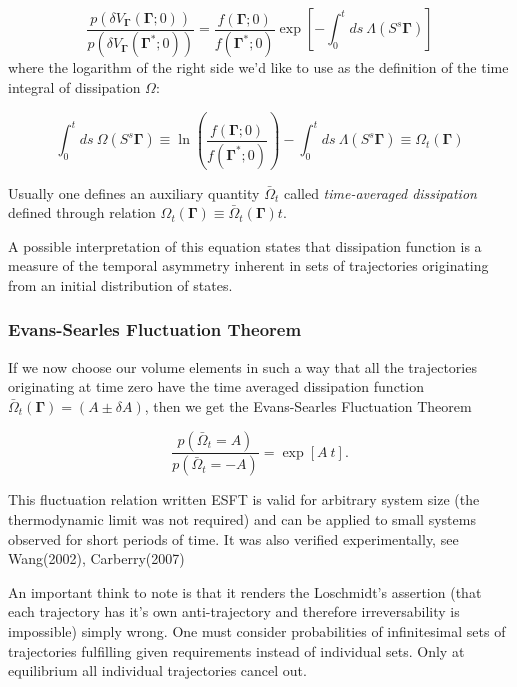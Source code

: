 \documentclass[a4paper,12pt,nofootinbib]{article}
\begin{document}
\begin{equation}
  \frac{p(\delta V_{\bm{\Gamma}}(\bm{\Gamma};0))}{p(\delta V_{\bm{\Gamma}}(\bm{\Gamma}^*;0))}=\frac{f(\bm{\Gamma};0)}{f(\bm{\Gamma}^*;0)} 
  \exp[-\int_0^t ds \ \Lambda(S^s \bm{\Gamma})]
\end{equation}
where the logarithm of the right side we'd like to use as the definition of the time integral of dissipation $\Omega$:

\begin{equation}
  \label{Dissipation}
  \int_0^t ds\ \Omega(S^s \bm{\Gamma})\equiv \ln(\frac{f(\bm{\Gamma};0)}{f(\bm{\Gamma}^*;0)}) -\int_0^t ds \ \Lambda(S^s \bm{\Gamma}) \equiv \Omega_t(\bm{\Gamma})
\end{equation}

Usually one defines an auxiliary quantity $\bar{\Omega}_t$ called \textit{time-averaged dissipation} defined through relation $\Omega_t(\bm{\Gamma}) \equiv \bar{\Omega}_t(\bm{\Gamma})t$.

A possible interpretation of this equation states that dissipation function is a measure of the temporal asymmetry inherent in sets of trajectories originating from an initial distribution of states.

\subsubsection{Evans-Searles Fluctuation Theorem}

If we now choose our volume elements in such a way that all the trajectories originating at time zero have the time averaged dissipation function $\bar{\Omega}_t(\bm{\Gamma})=(A \pm \delta A)$, then we get the Evans-Searles Fluctuation Theorem

\begin{equation}
\label{ESFT}
  \frac{p(\bar{\Omega}_t=A)}{p(\bar{\Omega}_t=-A)}=\exp[A\ t].
\end{equation}

This fluctuation relation written ESFT is valid for arbitrary system size (the thermodynamic limit was not required) and can be applied to small systems observed for short periods of time.
It was also verified experimentally, see Wang(2002)\cite{Wang:2002hw}, Carberry(2007)\cite{Carberry:2007be}

An important think to note is that it renders the Loschmidt's assertion (that each trajectory has it's own anti-trajectory and therefore irreversability is impossible) simply wrong. One must consider probabilities of infinitesimal sets of trajectories fulfilling given requirements instead of individual sets. Only at equilibrium all individual trajectories cancel out.
\end{document}
